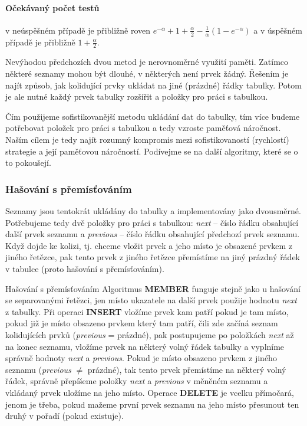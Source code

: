 \paragraph{Očekávaný počet testů} v neúspěšném případě je přibližně roven
$e^{-\alpha}+1+\frac{\alpha}{2}-\frac{1}{\alpha}(1-e^{-\alpha})$ a v úspěšném
případě je přibližně $1+\frac{\alpha}{2}$.

Nevýhodou předchozích dvou metod je nerovnoměrné využití paměti. Zatímco
některé seznamy mohou být dlouhé, v některých není prvek žádný. Řešením je najít
způsob, jak kolidující prvky ukládat na jiné (prázdné) řádky tabulky. Potom je
ale nutné každý prvek tabulky rozšířit a položky pro práci s tabulkou. 

Čím použijeme sofistikovanější metodu ukládání dat do tabulky, tím více budeme
potřebovat položek pro práci s tabulkou a tedy vzroste paměťová náročnost. Naším
cílem je tedy najít rozumný kompromis mezi sofistikovaností (rychlostí)
strategie a její paměťovou náročností. Podívejme se na další algoritmy,
které se o to pokoušejí.

\subsubsection*{Hašování s přemísťováním}

Seznamy jsou tentokrát ukládány do tabulky a implementovány jako dvousměrné.
Potřebujeme tedy dvě položky pro práci s tabulkou: \emph{next} -- číslo řádku
obsahující další prvek seznamu a \emph{previous} -- číslo řádku obsahující
předchozí prvek seznamu. Když dojde ke kolizi, tj. chceme vložit prvek a jeho
místo je obsazené prvkem z jiného řetězce, pak tento prvek z jiného řetězce
přemístíme na jiný prázdný řádek v tabulce (proto hašování s přemísťováním).

\begin{algoritmusN}{Hašování s přemísťováním}
Algoritmus \textbf{MEMBER} funguje stejně jako u hašování se separovanými
řetězci, jen místo ukazatele na další prvek použije hodnotu \emph{next} z
tabulky. Při operaci \textbf{INSERT} vložíme prvek kam patří pokud je tam místo,
pokud již je místo obsazeno prvkem který tam patří, čili zde začíná seznam
kolidujících prvků (\emph{previous} = prázdné), pak postupujeme po položkách
\emph{next} až na konec seznamu, vložíme prvek na některý volný řádek
tabulky a vyplníme správně hodnoty \emph{next} a \emph{previous}. Pokud je místo
obsazeno prvkem z jiného seznamu (\emph{previous} $\neq$ prázdné), tak tento
prvek přemístíme na některý volný řádek, správně přepíšeme položky \emph{next} a
\emph{previous} v měněném seznamu a vkládaný prvek uložíme na jeho místo.
Operace \textbf{DELETE} je vcelku přímočará, jenom je třeba, pokud mažeme první
prvek seznamu na jeho místo přesunout ten druhý v pořadí (pokud existuje).
\end{algoritmusN}


